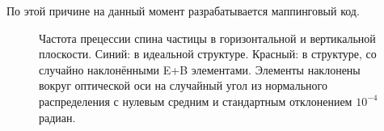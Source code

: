 \documentclass{article}
\begin{document}
	По этой причине на данный момент разрабатывается маппинговый код. 
	\setcounter{figure}{3}
	\begin{figure}[!htbp]
		\centering
	\end{figure}
	\begin{figure}[!htbp]\ContinuedFloat
		
		\caption{Частота прецессии спина частицы в горизонтальной и вертикальной плоскости. Синий: в идеальной структуре. Красный: в структуре, со случайно наклонёнными E+B элементами. Элементы наклонены вокруг оптической оси на случайный угол из нормального распределения с нулевым средним и стандартным отклонением $10^{-4}$ радиан.\label{fig:cross_plot}}
	\end{figure}
\end{document}
